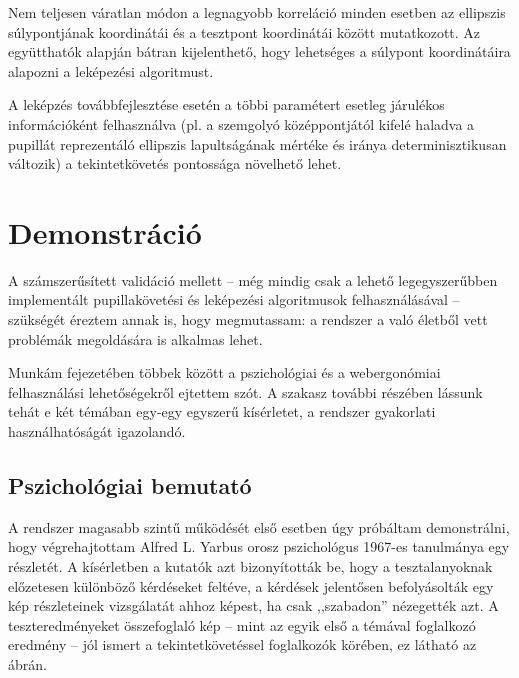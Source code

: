 Nem teljesen váratlan módon a legnagyobb korreláció minden esetben az ellipszis súlypontjának koordinátái és a tesztpont koordinátái között mutatkozott. Az együtthatók alapján bátran kijelenthető, hogy lehetséges a súlypont koordinátáira alapozni a leképezési algoritmust.

A leképzés továbbfejlesztése esetén a többi paramétert esetleg járulékos információként felhasználva (pl. a szemgolyó középpontjától kifelé haladva a pupillát reprezentáló ellipszis lapultságának mértéke és iránya determinisztikusan változik) a tekintetkövetés pontossága növelhető lehet.

\section{Demonstráció}\label{sect:demonstracio}

A számszerűsített validáció mellett -- még mindig csak a lehető legegyszerűbben implementált pupillakövetési és leképezési algoritmusok felhasználásával -- szükségét éreztem annak is, hogy megmutassam: a rendszer a való életből vett problémák megoldására is alkalmas lehet.

Munkám  fejezetében többek között a pszichológiai és a webergonómiai felhasználási lehetőségekről ejtettem szót. A szakasz további részében lássunk tehát e két témában egy-egy egyszerű kísérletet, a rendszer gyakorlati használhatóságát igazolandó. 

\subsection{Pszichológiai bemutató}\label{sect:pszicho}

A rendszer magasabb szintű működését első esetben úgy próbáltam demonstrálni, hogy végrehajtottam Alfred L. Yarbus orosz pszichológus 1967-es tanulmánya egy részletét. A kísérletben a kutatók azt bizonyították be, hogy a tesztalanyoknak előzetesen különböző kérdéseket feltéve, a kérdések jelentősen befolyásolták egy kép részleteinek vizsgálatát ahhoz képest, ha csak ,,szabadon'' nézegették azt. A teszteredményeket összefoglaló kép -- mint az egyik első a témával foglalkozó eredmény -- jól ismert a tekintetkövetéssel foglalkozók körében, ez látható az  ábrán.

